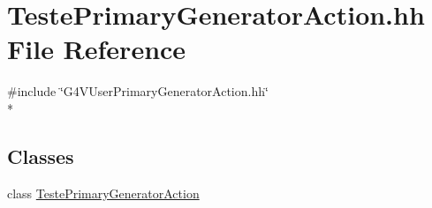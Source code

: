 \hypertarget{_teste_primary_generator_action_8hh}{\section{Teste\-Primary\-Generator\-Action.\-hh File Reference}
\label{_teste_primary_generator_action_8hh}
}
{\ttfamily \#include \char`\"{}G4\-V\-User\-Primary\-Generator\-Action.\-hh\char`\"{}}\\*
\subsection*{Classes}
\begin{DoxyCompactItemize}
\item 
class \hyperlink{class_teste_primary_generator_action}{Teste\-Primary\-Generator\-Action}
\end{DoxyCompactItemize}
